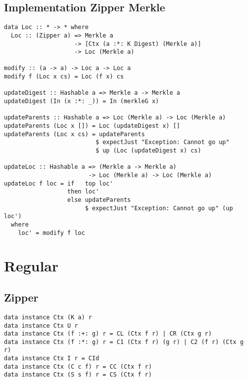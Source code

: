 \section{Implementation Zipper Merkle}
\label{app-impl-zipper-merkle}
\begin{verbatim}
data Loc :: * -> * where
  Loc :: (Zipper a) => Merkle a 
                    -> [Ctx (a :*: K Digest) (Merkle a)] 
                    -> Loc (Merkle a)

modify :: (a -> a) -> Loc a -> Loc a
modify f (Loc x cs) = Loc (f x) cs

updateDigest :: Hashable a => Merkle a -> Merkle a
updateDigest (In (x :*: _)) = In (merkleG x)

updateParents :: Hashable a => Loc (Merkle a) -> Loc (Merkle a)
updateParents (Loc x []) = Loc (updateDigest x) []
updateParents (Loc x cs) = updateParents
                          $ expectJust "Exception: Cannot go up"
                          $ up (Loc (updateDigest x) cs)

updateLoc :: Hashable a => (Merkle a -> Merkle a) 
                        -> Loc (Merkle a) -> Loc (Merkle a)
updateLoc f loc = if   top loc'
                  then loc'
                  else updateParents 
                       $ expectJust "Exception: Cannot go up" (up loc')
  where
    loc' = modify f loc
\end{verbatim}

\chapter{Regular}

\section{Zipper}
\begin{verbatim}
data instance Ctx (K a) r
data instance Ctx U r
data instance Ctx (f :+: g) r = CL (Ctx f r) | CR (Ctx g r)
data instance Ctx (f :*: g) r = C1 (Ctx f r) (g r) | C2 (f r) (Ctx g r)
data instance Ctx I r = CId
data instance Ctx (C c f) r = CC (Ctx f r)
data instance Ctx (S s f) r = CS (Ctx f r)
\end{verbatim}